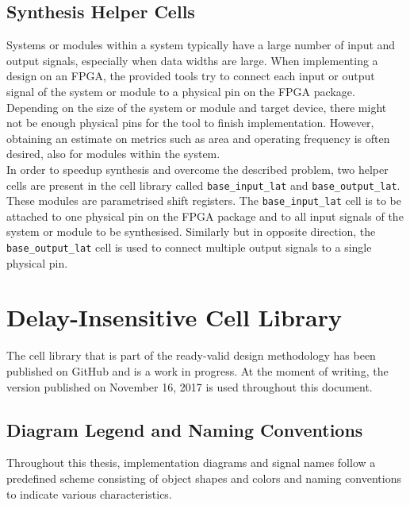 \subsection{Synthesis Helper Cells}
Systems or modules within a system typically have a large number of input and output signals, especially when data widths are large. When implementing a design on an FPGA, the provided tools try to connect each input or output signal of the system or module to a physical pin on the FPGA package. Depending on the size of the system or module and target device, there might not be enough physical pins for the tool to finish implementation. However, obtaining an estimate on metrics such as area and operating frequency is often desired, also for modules within the system.\\
In order to speedup synthesis and overcome the described problem, two helper cells are present in the cell library called \texttt{base\_input\_lat} and \texttt{base\_output\_lat}. These modules are parametrised shift registers. The \texttt{base\_input\_lat} cell is to be attached to one physical pin on the FPGA package and to all input signals of the system or module to be synthesised. Similarly but in opposite direction, the \texttt{base\_output\_lat} cell is used to connect multiple output signals to a single physical pin.





\section{Delay-Insensitive Cell Library}
\label{sec:cell-lib}
The cell library that is part of the ready-valid design methodology has been published on GitHub \cite{andy-lib} and is a work in progress. At the moment of writing, the version published on November 16, 2017 is used throughout this document.



\subsection{Diagram Legend and Naming Conventions}
Throughout this thesis, implementation diagrams and signal names follow a predefined scheme consisting of object shapes and colors and naming conventions to indicate various characteristics.



